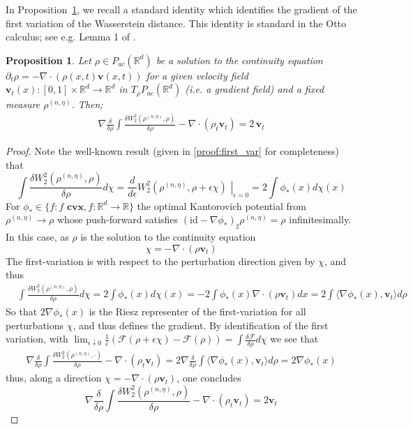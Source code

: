 \documentclass[reqno,11pt,letterpaper]{amsart}
\theoremstyle{plain}
\newtheorem{prop}{Proposition}
\theoremstyle{definition}
\theoremstyle{remark}
\newcommand{\mb}{\mathbf}
\begin{document}
In Proposition~\ref{prop:grad_first_var}, we recall a standard identity which identifies the gradient of the first variation of the Wasserstein distance. This identity is standard in the Otto calculus; see e.g. Lemma 1 of \cite{Lott2007}.

\begin{prop}\label{prop:grad_first_var}
Let $\rho \in {P}_{ac}(\mathbb{R}^{d})$ be a solution to the continuity equation $\partial_{t} \rho =- \nabla \cdot (\rho(x,t) \mathbf{v}(x,t))$ for a given velocity field $\mathbf{v}_{t}(x): [0,1] \times \mathbb{R}^{d}  \to \mathbb{R}^{d}$ in $T_{\rho} P_{ac}(\mathbb{R}^{d})$ (i.e. a gradient field) and a fixed measure $\rho^{(n,\eta)}$. Then;
\begin{align*}
    \nabla \frac{\delta}{\delta \rho} \int \frac{\delta W_{2}^{2}(\rho^{(n,\eta)}, \rho) }{\delta \rho} -\nabla\cdot \left( \rho_{t} \mathbf{v}_t \right) = 2 \,\mathbf{v}_t
\end{align*}
\end{prop}
\begin{proof}
Note the well-known \cite{Jordan1998,AGS2008,chewi2024statistical} result (given in \ref{proof:first_var} for completeness) that 
\[
\int \frac{\delta W_{2}^{2}(\rho^{(n,\eta)}, \rho)}{\delta \rho} d\chi = \frac{d}{d\epsilon} \left.  W_{2}^{2}(\rho^{(n,\eta)}, \rho + \epsilon \chi) \,\, \right|_{\epsilon = 0} = 2 \int \phi_{*}(x) d\chi(x)
\]
For $\phi_{*} \in \{ f : f\,\, \mathbf{cvx}, f: \mathbb{R}^{d}  \to \mathbb{R} \}$ the optimal Kantorovich potential from $\rho^{(n,\eta)} \to \rho$ whose push-forward satisfies $(\mathrm{id} - \nabla \phi_{*} )_{\sharp}\rho^{(n,\eta)} = \rho$ infinitesimally. In this case, as $\rho$ is the solution to the continuity equation
\[
\chi = - \nabla \cdot (\rho \mathbf{v}_t)
\]
The first-variation is with respect to the perturbation direction given by $\chi$, and thus
\begin{align*}
&\int \frac{\delta W_{2}^{2}(\rho^{(n, \eta)}, \rho)}{ \delta \rho} d\chi = 2 \int \phi_{*}(x) d \chi(x) = - 2 \int \phi_{*}(x)  \nabla \cdot (\rho \mathbf{v}_{t})dx = 2 \int\langle
\nabla\phi_{*}(x) , \mb{v}_{t} \rangle d\rho
\end{align*}
So that $2\nabla\phi_{*}(x)$ is the Riesz representer of the first-variation for all perturbations $\chi$, and thus defines the gradient. By identification of the first variation, with $\lim_{\epsilon \downarrow 0} \frac{1}{\epsilon} \left( \mathcal{F}(\rho+\epsilon \chi) - \mathcal{F}(\rho) \right) = \int \frac{\delta \mathcal{F}}{\delta \rho} d\chi$ we see that
\begin{align*}
\nabla\frac{\delta}{\delta \rho}\int \frac{\delta W_{2}^{2}(\rho^{(n,\eta)}, \cdot) }{\delta \rho} -\nabla\cdot \left( \rho_{t} \mathbf{v}_{t} \right) =
2 \nabla \frac{\delta}{\delta \rho}  \int\langle
\nabla\phi_{*}(x) , \mb{v}_{t} \rangle d\rho = 2 \nabla\phi_{*}(x) 
\end{align*}
thus, along a direction $\chi = - \nabla \cdot (\rho \mathbf{v}_t)$, one concludes
\[
\nabla \frac{\delta}{\delta\rho}  \int \frac{\delta W_{2}^{2}(\rho^{(n,\eta)}, \rho) }{\delta \rho} -\nabla\cdot \left( \rho_{t} \mathbf{v}_{t} \right) = 2 \mathbf{v}_{t}
\]
\end{proof}
\end{document}
